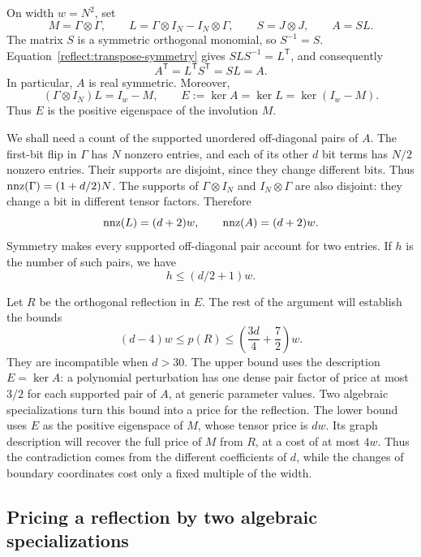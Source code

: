 On width $w=N^2$, set
\begin{equation}
 M=\Gamma\otimes\Gamma,\qquad
 L=\Gamma\otimes I_N-I_N\otimes\Gamma,\qquad
 S=J\otimes J,\qquad A=SL.
 \label{reflect:large-operators}
\end{equation}
The matrix $S$ is a symmetric orthogonal monomial, so $S^{-1}=S$.
Equation~\eqref{reflect:transpose-symmetry} gives
$SLS^{-1}=L^{\mathsf T}$, and consequently
\[
 A^{\mathsf T}=L^{\mathsf T}S^{\mathsf T}=SL=A.
\]
In particular, $A$ is real symmetric.  Moreover,
\begin{equation}
 (\Gamma\otimes I_N)L=I_w-M,
 \qquad
 E:=\ker A=\ker L=\ker(I_w-M).
 \label{reflect:kernel}
\end{equation}
Thus $E$ is the positive eigenspace of the involution $M$.

We shall need a count of the supported unordered off-diagonal pairs
of $A$.  The first-bit flip in $\Gamma$ has $N$ nonzero entries, and
each of its other $d$ bit terms has $N/2$ nonzero entries.  Their
supports are disjoint, since they change different bits.  Thus
$\operatorname{nnz}(\Gamma)=(1+d/2)N$.
The supports of $\Gamma\otimes I_N$ and $I_N\otimes\Gamma$ are
also disjoint: they change a bit in different tensor factors.
Therefore
\[
 \operatorname{nnz}(L)=(d+2)w,\qquad \operatorname{nnz}(A)=(d+2)w.
\]
Symmetry makes every supported off-diagonal pair account for two
entries.  If $h$ is the number of such pairs, we have
\begin{equation}
 h\leq (d/2+1)w.
 \label{reflect:pair-count}
\end{equation}

Let $R$ be the orthogonal reflection in $E$. The rest of the argument
will establish the bounds
\[
 (d-4)w\leq p(R)\leq
 \left(\frac{3d}{4}+\frac72\right)w.
\]
They are incompatible when $d>30$.
The upper bound uses the description $E=\ker A$: a polynomial
perturbation has one dense pair factor of price at most $3/2$ for
each supported pair of $A$, at generic parameter values. Two algebraic
specializations turn this bound into a price for the reflection.
The lower bound uses $E$ as the positive eigenspace of $M$, whose
tensor price is $dw$.
Its graph description will recover the full price of $M$ from $R$, at
a cost of at most $4w$. Thus the contradiction comes from the different
coefficients of $d$, while the changes of boundary coordinates cost
only a fixed multiple of the width.

\subsection{Pricing a reflection by two algebraic specializations}

